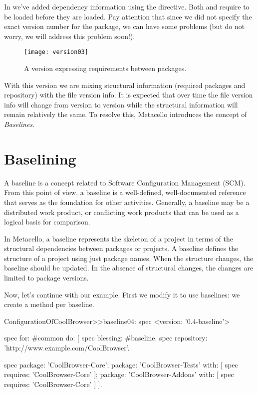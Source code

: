 \documentclass[a4paper,10pt,twoside]{book}
\begin{document}
In  we've added dependency information using the  directive.
Both  and   require  to be loaded before they are loaded. Pay attention that since we did not specify the exact version number for the  package, we can have some problems (but do not worry, we will address this problem soon!).

\begin{figure}
\begin{center}
\texttt{[image: version03]}
\caption{A version expressing requirements between packages.\label{fig:version03}}
\end{center}
\end{figure} 


With this version we are mixing structural information (required packages and repository) with the file version info. It is expected that over time the file version info will change from
version to version while the structural information will remain relatively the same. To resolve this, Metacello introduces the concept of {\em Baselines}.


\section{Baselining}
A baseline is a concept related to Software Configuration Management (SCM). From this point of view, a baseline is a well-defined, well-documented reference that serves as the foundation for other activities. Generally, a baseline may be a distributed work product, or conflicting work products that can be used as a logical basis for comparison. 

In Metacello, a baseline represents the skeleton of a project in terms of the structural dependencies between packages or projects. A baseline defines the structure of a project using just package names. When the structure changes, the baseline should be updated. In the absence of structural changes, the changes are limited to package versions.

Now, let's continue with our example. First we modify it to use baselines: we create a method per baseline. 

\begin{code}{}
ConfigurationOfCoolBrowser>>baseline04: spec 
       <version: '0.4-baseline'>
       
       spec for: #common do: [
              spec blessing: #baseline.
              spec repository: 'http://www.example.com/CoolBrowser'.
              
              spec 
                     package: 'CoolBrowser-Core';
                     package: 'CoolBrowser-Tests' with: [ spec requires: 'CoolBrowser-Core' ];
                     package: 'CoolBrowser-Addons' with: [ spec requires: 'CoolBrowser-Core' ] ].

\end{code}
\end{document}
